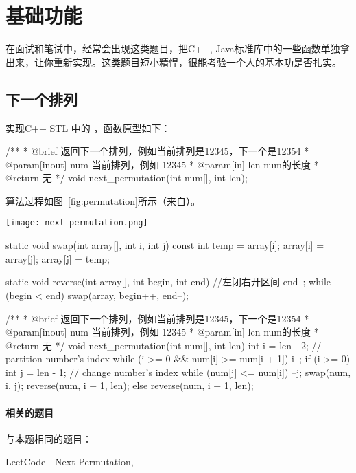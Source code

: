 \chapter{基础功能}
在面试和笔试中，经常会出现这类题目，把C++, Java标准库中的一些函数单独拿出来，让你重新实现。这类题目短小精悍，很能考验一个人的基本功是否扎实。

\section{下一个排列} %
实现C++ STL 中的 ，函数原型如下：

\begin{Code}
/**
 * @brief 返回下一个排列，例如当前排列是12345，下一个是12354
 * @param[inout] num 当前排列，例如 12345
 * @param[in] len num的长度
 * @return 无
 */
void next_permutation(int num[], int len);
\end{Code}

算法过程如图~\ref{fig:permutation}所示（来自）。

\begin{center}
\texttt{[image: next-permutation.png]}\\
\label{fig:permutation}
\end{center}

\begin{Codex}[label=next_permutation.c]
static void swap(int array[], int i, int j) {
    const int temp = array[i];
    array[i] = array[j];
    array[j] = temp;
}

static void reverse(int array[], int begin, int end) { //左闭右开区间
    end--;
    while (begin < end)
        swap(array, begin++, end--);
}

/**
 * @brief 返回下一个排列，例如当前排列是12345，下一个是12354
 * @param[inout] num 当前排列，例如 12345
 * @param[in] len num的长度
 * @return 无
 */
void next_permutation(int num[], int len) {
    int i = len - 2;  // partition number's index
    while (i >= 0 && num[i] >= num[i + 1])
        i--;
    if (i >= 0) {
        int j = len - 1;  // change number's index
        while (num[j] <= num[i])
            --j;
        swap(num, i, j);
        reverse(num, i + 1, len);
    } else {
        reverse(num, i + 1, len);
    }
}
\end{Codex}


\subsubsection{相关的题目}
与本题相同的题目：
\begindot
\item LeetCode -  Next Permutation, 
\myenddot


